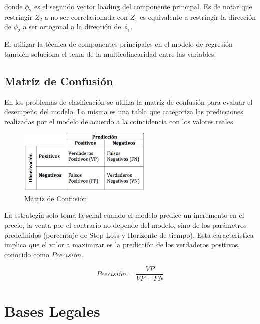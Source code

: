 \documentclass[a4paper,12pt]{Latex/Classes/PhDthesisPSnPDF}
\begin{document}
donde $\phi_{2}$ es el segundo vector loading del componente principal. Es de notar que restringir $Z_{2}$ a no ser correlasionada con $Z_{1}$ es equivalente a restringir la dirección de $\phi_{2}$ a ser ortogonal a la dirección de $\phi_{1}$.

El utilizar la técnica de componentes principales en el modelo de regresión también soluciona el tema de la multicolinearidad entre las variables. 

\subsection{Matríz de Confusión}

En los problemas de clasificación se utiliza la matríz de confusión para evaluar el desempeño del modelo. La misma es una tabla que categoriza las predicciones realizadas por el modelo de acuerdo a la coincidencia con los valores reales. 

\begin{figure}[ht]
\begin{center}
\includegraphics[width=2.5in]{images/confusion_matrix}
\end{center}
\caption{Matríz de Confusión}
\end{figure}

La estrategia solo toma la señal cuando el modelo predice un incremento en el precio, la venta por el contrario no depende del modelo, sino de los parámetros predefinidos (porcentaje de Stop Loss y Horizonte de tiempo). Esta característica implica que el valor a maximizar es la predicción de los verdaderos positivos, conocido como $Precisión$.

$$ Precisión = \frac{VP}{VP + FN} $$

\section{Bases Legales}


\end{document}
